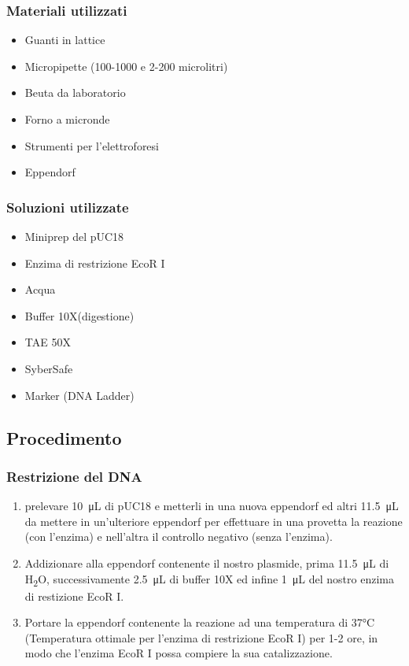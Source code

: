 \subsubsection{Materiali utilizzati}

\begin{itemize}
	\item Guanti in lattice
	\item Micropipette (100-1000 e 2-200 microlitri)
	\item Beuta da laboratorio
	\item Forno a micronde
	\item Strumenti per l'elettroforesi
	\item Eppendorf
\end{itemize}

\subsubsection{Soluzioni utilizzate}

\begin{itemize}

	\item Miniprep del pUC18
	\item Enzima di restrizione EcoR I
	\item Acqua
	\item Buffer 10X(digestione)
	\item TAE 50X
	\item SyberSafe
	\item Marker (DNA Ladder)

\end{itemize}

\subsection{Procedimento}

\subsubsection{Restrizione del DNA}

\begin{enumerate}

	\item prelevare \SI{10}{\micro\liter} di pUC18 e metterli in una nuova eppendorf
	ed altri \SI{11.5}{\micro\liter} da mettere in un'ulteriore eppendorf per effettuare in
	una provetta la reazione (con l'enzima) e nell'altra il controllo negativo (senza l'enzima).

	\item Addizionare alla eppendorf contenente il nostro plasmide,
	prima \SI{11.5}{\micro\liter} di H\textsubscript{2}O, successivamente
	\SI{2.5}{\micro\liter} di buffer 10X ed infine \SI{1}{\micro\liter} del nostro enzima di restizione EcoR I.

	\item Portare la eppendorf contenente la reazione ad una temperatura di 37°C
	(Temperatura ottimale per l'enzima di restrizione EcoR I) per 1-2 ore,
	in modo che l'enzima EcoR I possa compiere la sua catalizzazione.

\end{enumerate}

